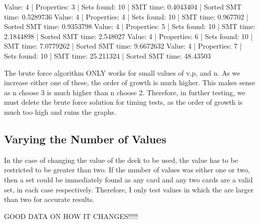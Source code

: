 \documentclass[pageno]{jpaper}
\begin{document}
Value: 4 | Properties: 3 | Sets found: 10 | SMT time: 0.4043404 | Sorted SMT time: 0.5289736
Value: 4 | Properties: 4 | Sets found: 10 | SMT time: 0.967702 | Sorted SMT time: 0.9353798
Value: 4 | Properties: 5 | Sets found: 10 | SMT time: 2.1844898 | Sorted SMT time: 2.548027
Value: 4 | Properties: 6 | Sets found: 10 | SMT time: 7.0779262 | Sorted SMT time: 9.6672632
Value: 4 | Properties: 7 | Sets found: 10 | SMT time: 25.211324 | Sorted SMT time: 48.43503




The brute force algorithm ONLY works for small values of v,p, and n. As we increase either one of these, the order of growth is much higher. This makes sense as n choose 3 is much higher than n choose 2. Therefore, in further testing, we must delete the brute force solution for timing tests, as the order of growth is much too high and ruins the graphs. 

\subsection{Varying the Number of Values}

In the case of changing the value of the deck to be used, the value has to be restricted to be greater than two. If the number of values was either one or two, then a set could be immediately found as any card and any two cards are a valid set, in each case respectively. Therefore, I only test values in which the are larger than two for accurate results. 

GOOD DATA ON HOW IT CHANGES!!!!! 
\end{document}
